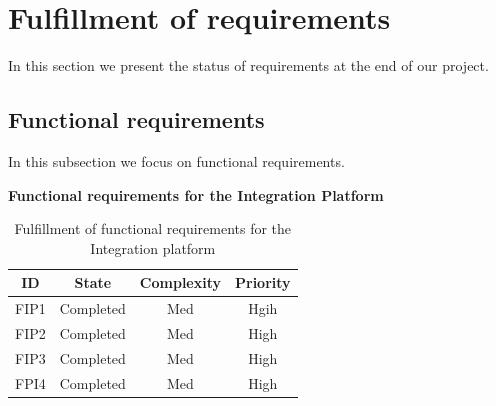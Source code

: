 \section{Fulfillment of requirements}

In this section we present the status of requirements at the end of our project.

\subsection{Functional requirements}

In this subsection we focus on functional requirements.

\textbf{Functional requirements for the Integration Platform}

\begin{table}[H]
\begin{center}
\begin{tabular}{ | c | c | c | c | }
  \hline
  \textbf{ID} & \textbf{State} & \textbf{Complexity} & \textbf{Priority} \\
  \hline\noalign{\smallskip}\noalign{\smallskip}\hline
  FIP1	& Completed & Med & Hgih \\
  FIP2	& Completed & Med & High \\
  FIP3	& Completed & Med & High \\
  FPI4	& Completed & Med & High \\
  \hline
\end{tabular}
\end{center}
\caption{Fulfillment of functional requirements for the Integration platform}
\label{table:fulfillemntofrequirements}
\end{table}


